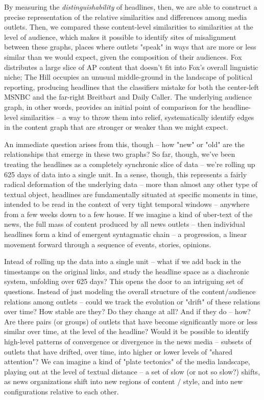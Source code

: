 \documentclass{scrartcl}
\begin{document}
By measuring the \textit{distinguishability} of headlines, then, we are able to construct a precise representation of the relative similarities and differences among media outlets. Then, we compared these content-level similarities to similarities at the level of audience, which makes it possible to identify sites of misalignment between these graphs, places where outlets "speak" in ways that are more or less similar than we would expect, given the composition of their audiences. Fox distributes a large slice of AP content that doesn't fit into Fox's overall linguistic niche; The Hill occupies an unusual middle-ground in the landscape of political reporting, producing headlines that the classifiers mistake for both the center-left MSNBC and the far-right Breitbart and Daily Caller. The underlying audience graph, in other words, provides an initial point of comparison for the headline-level similarities -- a way to throw them into relief, systematically identify edges in the content graph that are stronger or weaker than we might expect.

An immediate question arises from this, though -- how "new" or "old" are the relationships that emerge in these two graphs? So far, though, we've been treating the headlines as a completely synchronic slice of data -- we're rolling up 625 days of data into a single unit. In a sense, though, this represents a fairly radical deformation of the underlying data -- more than almost any other type of textual object, headlines are fundamentally situated at specific moments in time, intended to be read in the context of very tight temporal windows -- anywhere from a few weeks down to a few house. If we imagine a kind of uber-text of the news, the full mass of content produced by all news outlets -- then individual headlines form a kind of emergent syntagmatic chain -- a progression, a linear movement forward through a sequence of events, stories, opinions.

Intead of rolling up the data into a single unit -- what if we add back in the timestamps on the original links, and study the headline space as a diachronic system, unfolding over 625 days? This opens the door to an intriguing set of questions. Instead of just modeling the overall structure of the content/audience relations among outlets -- could we track the evolution or "drift" of these relations over time? How stable are they? Do they change at all? And if they do -- how? Are there pairs (or groups) of outlets that have become significantly more or less similar over time, at the level of the headline? Would it be possible to identify high-level patterns of convergence or divergence in the news media -- subsets of outlets that have drifted, over time, into higher or lower levels of "shared attention"? We can imagine a kind of "plate tectonics" of the media landscape, playing out at the level of textual distance -- a set of slow (or not so slow?) shifts, as news organizations shift into new regions of content / style, and into new configurations relative to each other.
\end{document}
